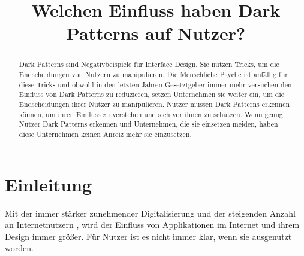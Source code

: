 \documentclass[conference,compsoc,final,a4paper]{IEEEtran}
\newcommand{\autoren}[0]{Karhan, Marvin}
\newcommand{\dokumententitel}[0]{Welchen Einfluss haben Dark Patterns auf Nutzer?}
\begin{document}
\title{\dokumententitel}

\author{
  \IEEEauthorblockN{\autoren}
}

\maketitle
\thispagestyle{plain}
\pagestyle{plain}


\begin{abstract}
  Dark Patterns sind Negativbeispiele für Interface Design. Sie nutzen Tricks, um die Endscheidungen von Nutzern zu manipulieren. Die Menschliche Psyche ist anfällig für diese Tricks und obwohl in den letzten Jahren Gesetztgeber immer mehr versuchen den Einfluss von Dark Patterns zu reduzieren, setzen Unternehmen sie weiter ein, um die Endscheidungen ihrer Nutzer zu manipulieren. Nutzer müssen Dark Patterns erkennen können, um ihren Einfluss zu verstehen und sich vor ihnen zu schützen. Wenn genug Nutzer Dark Patterns erkennen und Unternehmen, die sie einsetzen meiden, haben diese Unternehmen keinen Anreiz mehr sie einzusetzen.
\end{abstract}

{\small\tableofcontents}

\section{Einleitung}
Mit der immer stärker zunehmender Digitalisierung und der steigenden Anzahl an Internetnutzern \autocite{ITU2020}, wird der Einfluss von Applikationen im Internet und ihrem Design immer größer. Für Nutzer ist es nicht immer klar, wenn sie ausgenutzt worden.
\end{document}
